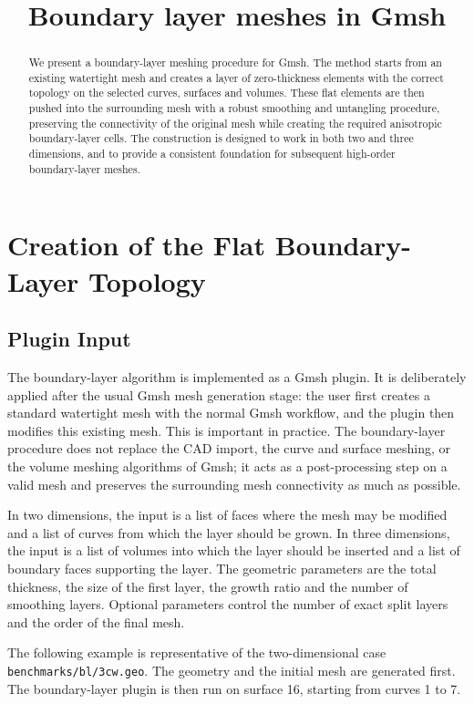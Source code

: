 \documentclass[11pt]{article}
\title{Boundary layer meshes in Gmsh}
\author{}
\date{}
\begin{document}
\maketitle

\begin{abstract}
We present a boundary-layer meshing procedure for Gmsh. The method starts from
an existing watertight mesh and creates a layer of zero-thickness elements with
the correct topology on the selected curves, surfaces and volumes. These flat
elements are then pushed into the surrounding mesh with a robust smoothing and
untangling procedure, preserving the connectivity of the original mesh while
creating the required anisotropic boundary-layer cells. The construction is
designed to work in both two and three dimensions, and to provide a consistent
foundation for subsequent high-order boundary-layer meshes.
\end{abstract}

\section{Creation of the Flat Boundary-Layer Topology}

\subsection{Plugin Input}

The boundary-layer algorithm is implemented as a Gmsh plugin. It is deliberately
applied after the usual Gmsh mesh generation stage: the user first creates a
standard watertight mesh with the normal Gmsh workflow, and the plugin then
modifies this existing mesh. This is important in practice. The boundary-layer
procedure does not replace the CAD import, the curve and surface meshing, or the
volume meshing algorithms of Gmsh; it acts as a post-processing step on a valid
mesh and preserves the surrounding mesh connectivity as much as possible.

In two dimensions, the input is a list of faces where the mesh may be modified
and a list of curves from which the layer should be grown. In three dimensions,
the input is a list of volumes into which the layer should be inserted and a
list of boundary faces supporting the layer. The geometric parameters are the
total thickness, the size of the first layer, the growth ratio and the number of
smoothing layers. Optional parameters control the number of exact split layers
and the order of the final mesh.

The following example is representative of the two-dimensional case
\texttt{benchmarks/bl/3cw.geo}. The geometry and the initial mesh are generated
first. The boundary-layer plugin is then run on surface 16, starting from curves
1 to 7.
\end{document}
